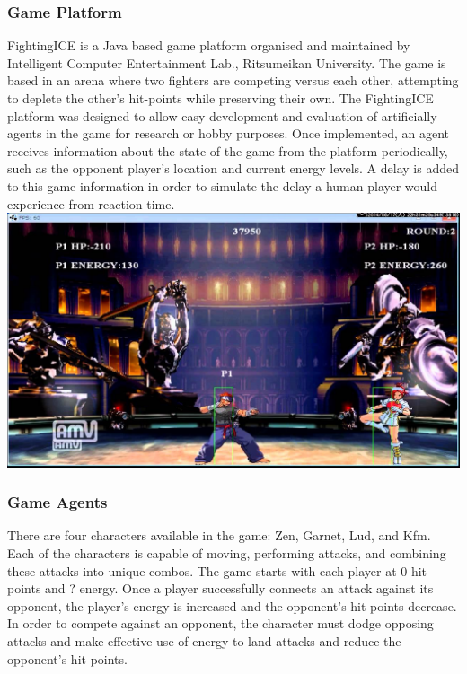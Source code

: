 \documentclass[11pt,a4paper]{article}
\begin{document}
\subsubsection{Game Platform}
FightingICE is a Java based game platform organised and maintained by Intelligent Computer Entertainment Lab., Ritsumeikan University. The game is based in an arena where two fighters are competing versus each other, attempting to deplete the other's hit-points while preserving their own. The FightingICE platform was designed to allow easy development and evaluation of artificially agents in the game for research or hobby purposes. Once implemented, an agent receives information about the state of the game from the platform periodically, such as the opponent player's location and current energy levels. A delay is added to this game information in order to simulate the delay a human player would experience from reaction time.\\
\includegraphics[width=\textwidth]{fightingICE}

\subsubsection{Game Agents}
There are four characters available in the game: Zen, Garnet, Lud, and Kfm. Each of the characters is capable of moving, performing attacks, and combining these attacks into unique combos. The game starts with each player at 0 hit-points and ? energy. Once a player successfully connects an attack against its opponent, the player's energy is increased and the opponent's hit-points decrease. In order to compete against an opponent, the character must dodge opposing attacks and make effective use of energy to land attacks and reduce the opponent's hit-points.\\
\end{document}
